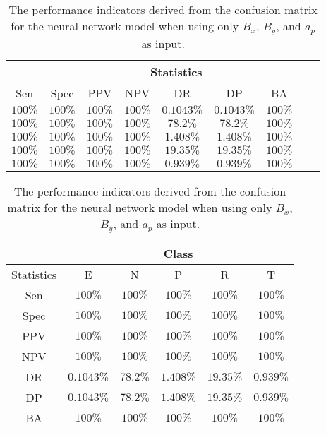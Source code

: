 \begin{table}[!ht]
	\centering
	\begin{tabular}{|c|c|c|c|c|c|c|c|c|}
		\hline
		 & \multicolumn{7}{c|}{Statistics} \\ \hline
		Sen & Spec & PPV & NPV & DR & DP & BA \\ \hline
		$100\%$ & $100\%$ & $100\%$ & $100\%$ & $0.1043\%$ & $0.1043\%$ & $100\%$ \\ \hline
		$100\%$ & $100\%$ & $100\%$ & $100\%$ & $78.2\%$ & $78.2\%$ & $100\%$ \\ \hline
		$100\%$ & $100\%$ & $100\%$ & $100\%$ & $1.408\%$ & $1.408\%$ & $100\%$ \\ \hline
		$100\%$ & $100\%$ & $100\%$ & $100\%$ & $19.35\%$ & $19.35\%$ & $100\%$ \\ \hline
		$100\%$ & $100\%$ & $100\%$ & $100\%$ & $0.939\%$ & $0.939\%$ & $100\%$ \\ \hline
	\end{tabular}
	\caption{The performance indicators derived from the confusion matrix for the neural network model when using only $B_{x}$, $B_{y}$, and $a_{p}$ as input.}
	\label{tab:cs:xyap:nnet}
\end{table}

\begin{table}[!ht]
	\centering
	\begin{tabular}{|c|c|c|c|c|c|}
		\hline
		 & \multicolumn{5}{c|}{Class} \\ \hline
		Statistics & E & N & P & R & T \\ \hline
		Sen & $100\%$ & $100\%$ & $100\%$ & $100\%$ & $100\%$ \\ \hline
		Spec & $100\%$ & $100\%$ & $100\%$ & $100\%$ & $100\%$ \\ \hline
		PPV & $100\%$ & $100\%$ & $100\%$ & $100\%$ & $100\%$ \\ \hline
		NPV & $100\%$ & $100\%$ & $100\%$ & $100\%$ & $100\%$ \\ \hline
		DR & $0.1043\%$ & $78.2\%$ & $1.408\%$ & $19.35\%$ & $0.939\%$ \\ \hline
		DP & $0.1043\%$ & $78.2\%$ & $1.408\%$ & $19.35\%$ & $0.939\%$ \\ \hline
		BA & $100\%$ & $100\%$ & $100\%$ & $100\%$ & $100\%$ \\ \hline
	\end{tabular}
	\caption{The performance indicators derived from the confusion matrix for the neural network model when using only $B_{x}$, $B_{y}$, and $a_{p}$ as input.}
	\label{tab:cs:reverse:xyap:nnet}
\end{table}

